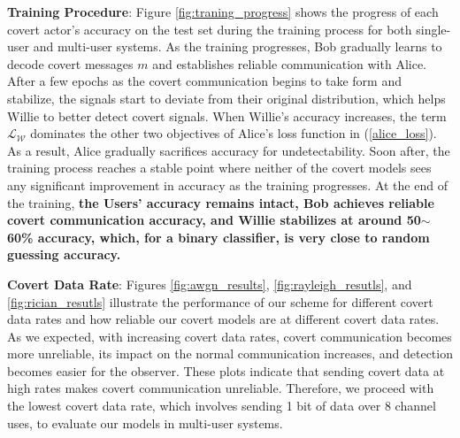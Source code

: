 \textbf{Training Procedure}: Figure \ref{fig:traning_progress} shows the progress of each covert actor's accuracy on the test set during the training process for both single-user and multi-user systems. As the training progresses, Bob gradually learns to decode covert messages \(m\) and establishes reliable communication with Alice. After a few epochs as the covert communication begins to take form and stabilize, the signals start to deviate from their original distribution, which helps Willie to better detect covert signals. When Willie's accuracy increases, the term \(\mathcal{L}_{\mathcal{W}}\) dominates the other two objectives of Alice's loss function in (\ref{alice_loss}). As a result, Alice gradually sacrifices accuracy for undetectability. Soon after, the training process reaches a stable point where neither of the covert models sees any significant improvement in accuracy as the training progresses. At the end of the training, \textbf{the Users' accuracy remains intact, Bob achieves reliable covert communication accuracy, and Willie stabilizes at around 50$\sim$60\% accuracy, which, for a binary classifier, is very close to random guessing accuracy.}

\textbf{Covert Data Rate}: Figures \ref{fig:awgn_results}, \ref{fig:rayleigh_resutls}, and \ref{fig:rician_resutls} illustrate the performance of our scheme for different covert data rates and how reliable our covert models are at different covert data rates. As we expected, with increasing covert data rates, covert communication becomes more unreliable, its impact on the normal communication increases, and detection becomes easier for the observer. These plots indicate that sending covert data at high rates makes covert communication unreliable. Therefore, we proceed with the lowest covert data rate, which involves sending 1 bit of data over 8 channel uses, to evaluate our models in multi-user systems.

